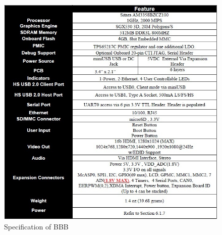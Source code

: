 \begin{figure}[h]
	\centering
	\includegraphics[scale=0.6]{fig/BBB_specs.jpg}
	\caption{Specification of BBB }
	\label{fig:bbb_specs}
\end{figure}

%				

